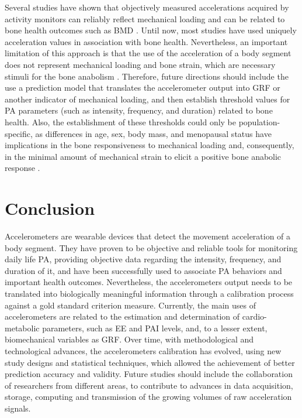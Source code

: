 \documentclass[12pt]{article}
\begin{document}
Several studies have shown that objectively measured accelerations acquired by activity monitors can reliably reflect mechanical loading  and can be related to bone health outcomes such as BMD . Until now, most studies have used uniquely acceleration values in association with bone health. Nevertheless, an important limitation of this approach is that the use of the acceleration of a body segment does not represent mechanical loading and bone strain, which are necessary stimuli for the bone anabolism . Therefore, future directions should include the use a prediction model that translates the accelerometer output into GRF or another indicator of mechanical loading, and then establish threshold values for PA parameters (such as intensity, frequency, and duration) related to bone health. Also, the establishment of these thresholds could only be population-specific, as differences in age, sex, body mass, and menopausal status have implications in the bone responsiveness to mechanical loading and, consequently, in the minimal amount of mechanical strain to elicit a positive bone anabolic response .

\section*{Conclusion}

Accelerometers are wearable devices that detect the movement acceleration of a body segment. They have proven to be objective and reliable tools for monitoring daily life PA, providing objective data regarding the intensity, frequency, and duration of it, and have been successfully used to associate PA behaviors and important health outcomes. Nevertheless, the accelerometers output needs to be translated into biologically meaningful information through a calibration process against a gold standard criterion measure. Currently, the main uses of accelerometers are related to the estimation and determination of cardio-metabolic parameters, such as EE and PAI levels, and, to a lesser extent, biomechanical variables as GRF. Over time, with methodological and technological advances, the accelerometers calibration has evolved, using new study designs and statistical techniques, which allowed the achievement of better prediction accuracy and validity. Future studies should include the collaboration of researchers from different areas, to contribute to advances in data acquisition, storage, computing and transmission of the growing volumes of raw acceleration signals.
\end{document}

